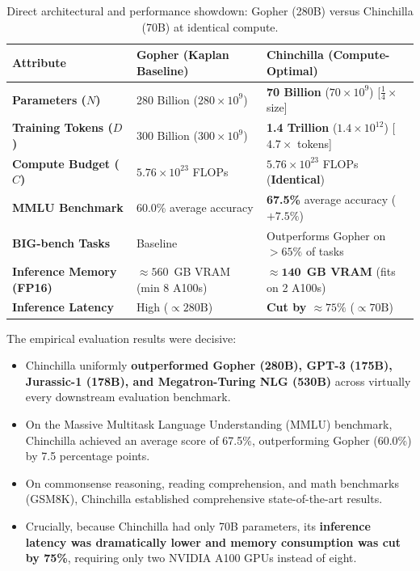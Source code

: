 \documentclass[../../main.tex]{subfiles}
\begin{document}
\begin{table}[htbp]
\centering
\small
\caption{Direct architectural and performance showdown: Gopher (280B) versus Chinchilla (70B) at identical compute.}
\label{tab:chinchilla_vs_gopher}
\begin{tabularx}{\textwidth}{lXX}
\toprule
\textbf{Attribute} & \textbf{Gopher (Kaplan Baseline)} & \textbf{Chinchilla (Compute-Optimal)} \\
\midrule
\textbf{Parameters ($N$)} & 280 Billion ($280 \times 10^9$) & \textbf{70 Billion} ($70 \times 10^9$) [$\frac{1}{4}\times$ size] \\
\textbf{Training Tokens ($D$)} & 300 Billion ($300 \times 10^9$) & \textbf{1.4 Trillion} ($1.4 \times 10^{12}$) [$4.7\times$ tokens] \\
\textbf{Compute Budget ($C$)} & $5.76 \times 10^{23}$ FLOPs & $5.76 \times 10^{23}$ FLOPs (\textbf{Identical}) \\
\textbf{MMLU Benchmark} & 60.0\% average accuracy & \textbf{67.5\%} average accuracy ($+7.5\%$) \\
\textbf{BIG-bench Tasks} & Baseline & Outperforms Gopher on $>65\%$ of tasks \\
\textbf{Inference Memory (FP16)} & $\approx 560$~GB VRAM (min 8 A100s) & $\approx \mathbf{140}$~\textbf{GB VRAM} (fits on 2 A100s) \\
\textbf{Inference Latency} & High ($\propto 280\text{B}$) & \textbf{Cut by $\approx 75\%$} ($\propto 70\text{B}$) \\
\bottomrule
\end{tabularx}
\end{table}

The empirical evaluation results were decisive:
\begin{itemize}
    \item Chinchilla uniformly \textbf{outperformed Gopher (280B), GPT-3 (175B), Jurassic-1 (178B), and Megatron-Turing NLG (530B)} across virtually every downstream evaluation benchmark.
    \item On the Massive Multitask Language Understanding (MMLU) benchmark, Chinchilla achieved an average score of 67.5\%, outperforming Gopher (60.0\%) by 7.5 percentage points.
    \item On commonsense reasoning, reading comprehension, and math benchmarks (GSM8K), Chinchilla established comprehensive state-of-the-art results.
    \item Crucially, because Chinchilla had only 70B parameters, its \textbf{inference latency was dramatically lower and memory consumption was cut by 75\%}, requiring only two NVIDIA A100 GPUs instead of eight.
\end{itemize}
\end{document}
